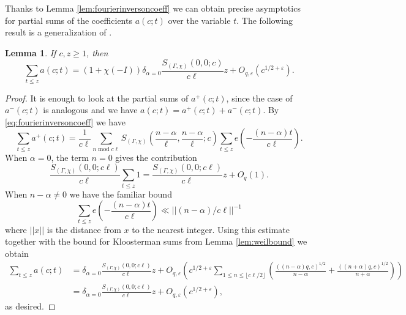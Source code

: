 \documentclass{article}
\newtheorem{lem}[thm]{Lemma}
\theoremstyle{named}
\DeclareMathOperator{\modulo}{mod}
\begin{document}
Thanks to Lemma \ref{lem:fourierinversoncoeff} we can obtain precise asymptotics for partial sums of the coefficients $a(c; t)$ over the variable $t$. The following result is a generalization of \cite[Lemma 2.3]{Soundararajan_2013}.
\begin{lem}\label{lem:sumofcoefficients}
If $c,z \geq 1$, then
\begin{equation}\label{eq:sumofcoefficients}
    \sum_{t \leq z} a(c; t) = (1 + \chi(-I))\delta_{\alpha = 0}\frac{S_{(\Gamma, \chi)}(0, 0; c)}{c\ell}  z + O_{q, \varepsilon}(c^{1/2 + \varepsilon}).
\end{equation}
\end{lem}
\begin{proof}
It is enough to look at the partial sums of $a^+(c; t)$, since the case of $a^{-}(c; t)$ is analogous and we have $a(c; t) = a^+(c; t) + a^{-}(c; t)$. By \eqref{eq:fourierinversoncoeff} we have  
\begin{equation*}
    \sum_{t \leq z} a^+(c; t) = \frac{1}{c\ell}\sum_{n \modulo c\ell}S_{(\Gamma, \chi)}\left(\frac{n-\alpha}{\ell},\frac{n-\alpha}{\ell}; c\right)\sum_{t\leq z} e\left(-\frac{(n-\alpha)t}{c\ell}\right).
\end{equation*}
When $\alpha = 0$, the term $n = 0$ gives the contribution
\begin{equation*}
\frac{S_{(\Gamma, \chi)}(0, 0;c\ell)}{c\ell}\sum_{t \leq z}1 =  \frac{S_{(\Gamma, \chi)}(0, 0;c\ell)}{c\ell}z + O_q(1).
\end{equation*}
When $n -\alpha \neq 0$ we have the familiar bound
\begin{equation*}
    \sum_{t \leq z}e\left(-\frac{(n-\alpha)t}{c\ell}\right) \ll ||(n-\alpha)/c\ell||^{-1}
\end{equation*}
where $||x||$ is the distance from $x$ to the nearest integer. Using this estimate together with the bound for Kloosterman sums from Lemma \ref{lem:weilbound} we obtain
\begin{equation*}
\begin{aligned}
    \sum_{t \leq z} a(c; t) & =\delta_{\alpha = 0}\frac{S_{(\Gamma, \chi)}(0, 0; c\ell)}{c\ell}  z + O_{q, \varepsilon}\left(c^{1/2 + \varepsilon}\sum_{1\leq n \leq \lfloor c\ell/2\rfloor } \left(\frac{((n-\alpha)q, c)^{1/2}}{n-\alpha} + \frac{((n+\alpha)q, c)^{1/2}}{n+\alpha}\right)\right)\\
    & = \delta_{\alpha = 0}\frac{S_{(\Gamma, \chi)}(0, 0; c\ell)}{c\ell}  z  + O_{q, \varepsilon}(c^{1/2 + \varepsilon}),
\end{aligned}
\end{equation*}
as desired.
\end{proof}
\end{document}
